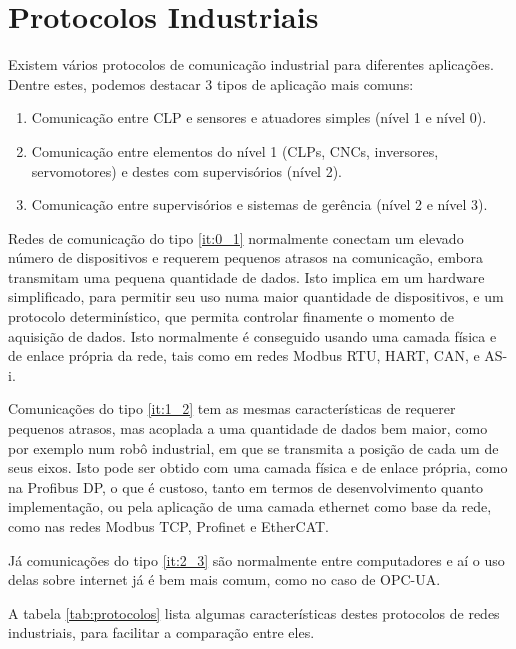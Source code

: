 \section{Protocolos Industriais}

Existem vários protocolos de comunicação industrial para diferentes aplicações. Dentre estes, podemos destacar 3 tipos de aplicação mais comuns:
\begin{enumerate}
    \item \label{it:0_1}Comunicação entre CLP e sensores e atuadores simples (nível 1 e nível 0).
    \item \label{it:1_2}Comunicação entre elementos do nível 1 (CLPs, CNCs, inversores, servomotores) e destes com supervisórios (nível 2).
    \item \label{it:2_3}Comunicação entre supervisórios e sistemas de gerência (nível 2 e nível 3).
\end{enumerate}

Redes de comunicação do tipo \ref{it:0_1} normalmente conectam um elevado número de dispositivos e requerem pequenos atrasos na comunicação, embora transmitam uma pequena quantidade de dados. Isto implica em um hardware simplificado, para permitir seu uso numa maior quantidade de dispositivos, e um protocolo determinístico, que permita controlar finamente o momento de aquisição de dados. Isto normalmente é conseguido usando uma camada física e de enlace própria da rede, tais como em redes Modbus RTU, HART, CAN, e AS-i.

Comunicações do tipo \ref{it:1_2} tem as mesmas características de requerer pequenos atrasos, mas acoplada a uma quantidade de dados bem maior, como por exemplo num robô industrial, em que se transmita a posição de cada um de seus eixos. Isto pode ser obtido com uma camada física e de enlace própria, como na Profibus DP, o que é custoso, tanto em termos de desenvolvimento quanto implementação, ou pela aplicação de uma camada ethernet como base da rede, como nas redes Modbus TCP, Profinet e EtherCAT.

Já comunicações do tipo \ref{it:2_3} são normalmente entre computadores e aí o uso delas sobre internet já é bem mais comum, como no caso de OPC-UA.

A tabela \ref{tab:protocolos} lista algumas características destes protocolos de redes industriais, para facilitar a comparação entre eles.

